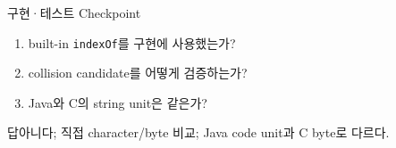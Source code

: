 \begin{frame}{구현·테스트 Checkpoint}
\begin{enumerate}\item built-in \texttt{indexOf}를 구현에 사용했는가?\item collision candidate를 어떻게 검증하는가?\item Java와 C의 string unit은 같은가?\end{enumerate}
\begin{exampleblock}{답}아니다; 직접 character/byte 비교; Java code unit과 C byte로 다르다.\end{exampleblock}
\end{frame}
